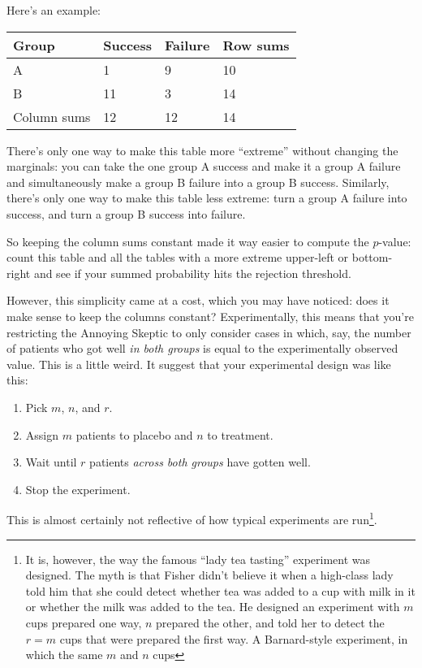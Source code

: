 \documentclass{book}
\providecommand{\tightlist}{%
  \setlength{\itemsep}{0pt}\setlength{\parskip}{0pt}}
\begin{document}
Here's an example:

\begin{longtable}[]{@{}llll@{}}
\toprule
Group & Success & Failure & Row sums\tabularnewline
\midrule
\endhead
A & 1 & 9 & 10\tabularnewline
B & 11 & 3 & 14\tabularnewline
Column sums & 12 & 12 & 14\tabularnewline
\bottomrule
\end{longtable}

There's only one way to make this table more ``extreme'' without
changing the marginals: you can take the one group A success and make it
a group A failure and simultaneously make a group B failure into a group
B success. Similarly, there's only one way to make this table less
extreme: turn a group A failure into success, and turn a group B success
into failure.

So keeping the column sums constant made it way easier to compute the
\(p\)-value: count this table and all the tables with a more extreme
upper-left or bottom-right and see if your summed probability hits the
rejection threshold.

However, this simplicity came at a cost, which you may have noticed:
does it make sense to keep the columns constant? Experimentally, this
means that you're restricting the Annoying Skeptic to only consider
cases in which, say, the number of patients who got well \emph{in both
groups} is equal to the experimentally observed value. This is a little
weird. It suggest that your experimental design was like this:

\begin{enumerate}
\def\labelenumi{\arabic{enumi}.}
\tightlist
\item
  Pick \(m\), \(n\), and \(r\).
\item
  Assign \(m\) patients to placebo and \(n\) to treatment.
\item
  Wait until \(r\) patients \emph{across both groups} have gotten well.
\item
  Stop the experiment.
\end{enumerate}

This is almost certainly not reflective of how typical experiments are
run\footnote{It is, however, the way the famous ``lady tea tasting''
  experiment was designed. The myth is that Fisher didn't believe it
  when a high-class lady told him that she could detect whether tea was
  added to a cup with milk in it or whether the milk was added to the
  tea. He designed an experiment with \(m\) cups prepared one way, \(n\)
  prepared the other, and told her to detect the \(r = m\) cups that
  were prepared the first way. A Barnard-style experiment, in which the
  same \(m\) and \(n\) cups}.
\end{document}
